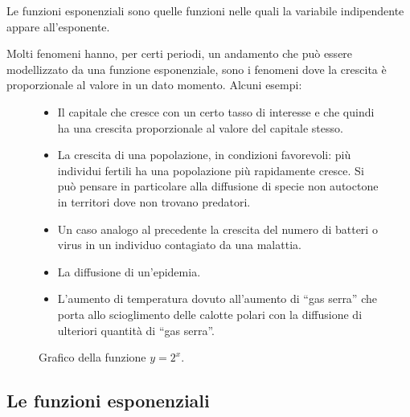 \begin{definizione}{
Le funzioni esponenziali
sono quelle funzioni nelle quali la variabile indipendente appare all'esponente.
}
\end{definizione}

Molti fenomeni hanno, per certi periodi, un andamento che può essere 
modellizzato da una funzione esponenziale, sono i fenomeni dove la crescita è 
proporzionale al valore in un dato momento. Alcuni esempi:

\begin{figure}[h]
 \centering
 \begin{minipage}[]{.48\textwidth}
\begin{itemize}
 \item 
Il capitale che cresce con un certo tasso di interesse e che quindi ha una 
crescita proporzionale al valore del capitale stesso.
 \item 
La crescita di una popolazione, in condizioni favorevoli: più individui fertili 
ha una popolazione più rapidamente cresce. 
Si può pensare in particolare alla diffusione di specie non autoctone in 
territori dove non trovano predatori.
 \item 
Un caso analogo al precedente la crescita del numero di batteri o virus in un 
individuo contagiato da una malattia.
 \item 
La diffusione di un'epidemia.
 \item 
L'aumento di temperatura dovuto all'aumento di ``gas serra'' che porta allo 
scioglimento delle calotte polari con la diffusione di ulteriori quantità di 
``gas serra''.
\end{itemize}

\end{minipage}
\begin{minipage}[]{.48\textwidth}
\begin{center}
\begin{inaccessibleblock}
  \graficoesponenziale
  \caption{Grafico della funzione \(y=2^x\).} \label{fig:funx2^x}
\end{inaccessibleblock}
\end{center}
\end{minipage}
\end{figure}

\subsection{Le funzioni esponenziali}
\label{subsec:esplog_fesponenziale}

